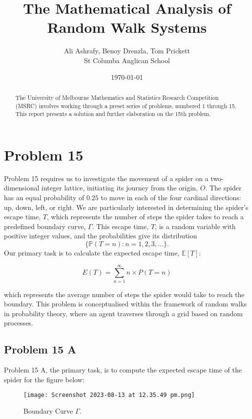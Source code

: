 \documentclass[12pt,a4paper]{article}
\title{The Mathematical Analysis of Random Walk Systems}
\author{Ali Ashrafy, Benoy Drenzla, Tom Prickett \\ St Columba Anglican School}
\date{\today}
\begin{document}
\maketitle

\begin{abstract}
The University of Melbourne Mathematics and Statistics Research Competition (MSRC) involves working through a preset series of problems, numbered 1 through 15. This report presents a solution and further elaboration on the 15th problem.
\end{abstract}

\section{Problem 15}
Problem 15 requires us to investigate the movement of a spider on a two-dimensional integer lattice, initiating its journey from the origin, \(O\). The spider has an equal probability of \(0.25\) to move in each of the four cardinal directions: up, down, left, or right. We are particularly interested in determining the spider's escape time, \(T\), which represents the number of steps the spider takes to reach a predefined boundary curve, \(\Gamma\). This escape time, \(T\), is a random variable with positive integer values, and the probabilities give its distribution 
\[
\{\mathbb{P}(T=n) : n = 1, 2, 3, ...\}.
\] 
Our primary task is to calculate the expected escape time, \(\mathbb{E}[T]\):

\begin{equation}
    E(T) = \sum_{n=1}^{\infty} n \times P(T=n)
\end{equation}

which represents the average number of steps the spider would take to reach the boundary. This problem is conceptualised within the framework of random walks in probability theory, where an agent traverses through a grid based on random processes.

\subsection{Problem 15 A}
Problem 15 A, the primary task, is to compute the expected escape time of the spider for the figure below:

\begin{figure}[htbp]
    \centering
    \texttt{[image: Screenshot 2023-08-13 at 12.35.49 pm.png]}
    \caption{Boundary Curve $\Gamma$.}
    \label{fig:MSRC1}
\end{figure}
\end{document}
